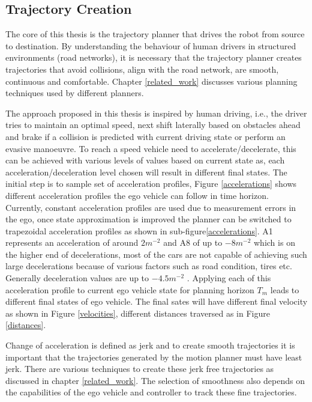 \subsection{ Trajectory Creation} \label{traj_creation}

The core of this thesis is the trajectory planner that drives the robot from source to destination. By understanding the behaviour of human drivers in structured environments (road networks), it is necessary that the trajectory planner creates trajectories that avoid collisions, align with the road network, are smooth, continuous and comfortable. Chapter \ref{related_work} discusses various planning techniques used by different planners. 


The approach proposed in this thesis is inspired by human driving, i.e., the driver tries to maintain an optimal speed, next shift laterally based on obstacles ahead and brake if a collision is predicted with current driving state or perform an evasive manoeuvre. To reach a speed vehicle need to accelerate/decelerate, this can be achieved with various levels of values based on current state as, each acceleration/deceleration level chosen will result in different final states. The initial step is to sample set of acceleration profiles, Figure \ref{accelerations} shows different acceleration profiles the ego vehicle can follow in time horizon. Currently, constant acceleration profiles are used due to measurement errors in the ego, once state approximation is improved the planner can be switched to trapezoidal acceleration profiles as shown in sub-figure\ref{accelerations}. A1 represents an acceleration of around $2m^{-2}$ and A8 of up to $-8m^{-2}$ which is on the higher end of decelerations, most of the cars are not capable of achieving such large decelerations because of various factors such as road condition, tires etc. Generally deceleration values are up to $-4.5m^{-2}$ \cite{denmark_breaking} \cite{accelerations_study} \cite{accelerations_study_2}. Applying each of this acceleration profile to current ego vehicle state for planning horizon $ T_m $ leads to different final states of ego vehicle. The final sates will have different final velocity as shown in Figure \ref{velocities}, different distances traversed as in Figure \ref{distances}.

Change of acceleration is defined as jerk and to create smooth trajectories it is important that the trajectories generated by the motion planner must have least jerk. There are various techniques to create these jerk free trajectories as discussed in chapter \ref{related_work}. The selection of smoothness also depends on the capabilities of the ego vehicle and controller to track these fine trajectories.
 
